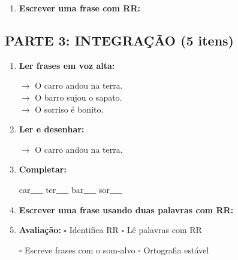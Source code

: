\begin{exercicio}
\begin{enumerate}[resume]
  \item \textbf{Escrever uma frase com RR:}
  \begin{center}
  \underline{\hspace{12cm}}
  \end{center}

\end{enumerate}

\subsection*{PARTE 3: INTEGRAÇÃO (5 itens)}

\begin{enumerate}[resume]

  \item \textbf{Ler frases em voz alta:}
  \begin{center}
  $\rightarrow$ O carro andou na terra.\\
  $\rightarrow$ O barro sujou o sapato.\\
  $\rightarrow$ O sorriso é bonito.\\
  \end{center}

  \item \textbf{Ler e desenhar:}
  \begin{center}
  $\rightarrow$ O carro andou na terra.
  \end{center}
  \begin{center}
  \end{center}

  \item \textbf{Completar:}
  \begin{center}
  car\underline{~~~} \quad ter\underline{~~~} \quad bar\underline{~~~} \quad sor\underline{~~~}
  \end{center}

  \item \textbf{Escrever uma frase usando duas palavras com RR:}
  \begin{center}
  \underline{\hspace{12cm}}
  \end{center}

  \item \textbf{Avaliação:} $\square$ Identifica RR \quad $\square$ Lê palavras com RR
  \begin{center}
  $\square$ Escreve frases com o som-alvo \quad $\square$ Ortografia estável
  \end{center}


\end{enumerate}
\end{exercicio}

